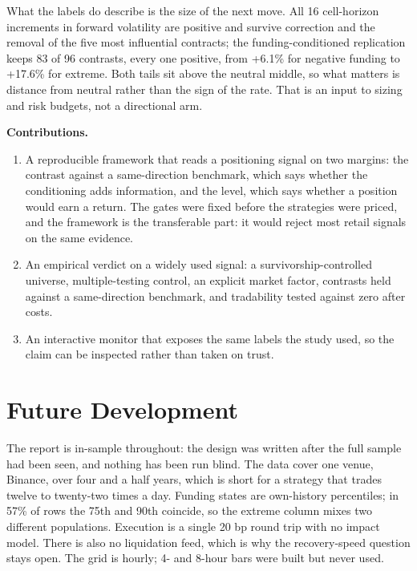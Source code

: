 \documentclass[11pt,a4paper]{article}
\begin{document}
What the labels do describe is the size of the next move. All 16 cell-horizon increments in forward volatility are positive and survive correction and the removal of the five most influential contracts; the funding-conditioned replication keeps 83 of 96 contrasts, every one positive, from +6.1\% for negative funding to +17.6\% for extreme. Both tails sit above the neutral middle, so what matters is distance from neutral rather than the sign of the rate. That is an input to sizing and risk budgets, not a directional arm.

\textbf{Contributions.}

\begin{enumerate}
\item A reproducible framework that reads a positioning signal on two margins: the contrast against a same-direction benchmark, which says whether the conditioning adds information, and the level, which says whether a position would earn a return. The gates were fixed before the strategies were priced, and the framework is the transferable part: it would reject most retail signals on the same evidence.
\item An empirical verdict on a widely used signal: a survivorship-controlled universe, multiple-testing control, an explicit market factor, contrasts held against a same-direction benchmark, and tradability tested against zero after costs.
\item An interactive monitor that exposes the same labels the study used, so the claim can be inspected rather than taken on trust.
\end{enumerate}

\bigskip

\section{Future Development}

The report is in-sample throughout: the design was written after the full sample had been seen, and nothing has been run blind. The data cover one venue, Binance, over four and a half years, which is short for a strategy that trades twelve to twenty-two times a day. Funding states are own-history percentiles; in 57\% of rows the 75th and 90th coincide, so the extreme column mixes two different populations. Execution is a single 20 bp round trip with no impact model. There is also no liquidation feed, which is why the recovery-speed question stays open. The grid is hourly; 4- and 8-hour bars were built but never used.
\end{document}
